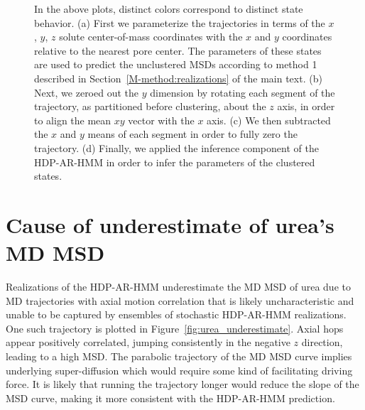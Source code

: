 \documentclass{article}
\begin{document}
\begin{figure}
\begin{subfigure}{0.6\textwidth}
		\caption{}\label{fig:zeroed_clustered_hmm}
	\end{subfigure}  
	\caption{In the above plots, distinct colors correspond to distinct state behavior. 
	(a) First we parameterize the trajectories in terms of the $x$, $y$, $z$ solute 
	center-of-mass coordinates with the $x$ and $y$ coordinates relative to the nearest 
	pore center. The parameters of these states are used to predict the unclustered MSDs
	according to method 1 described in Section~\ref{M-method:realizations} of the main
	text. (b) Next, we zeroed out the $y$ dimension by rotating each segment of the 
	trajectory, as partitioned before clustering, about the $z$ axis, in order to align the 
  	mean $xy$ vector with the $x$ axis. (c) We then subtracted the $x$ and $y$ means of
  	each segment in order to fully zero the trajectory. (d) Finally, we applied the 
  	inference component of the HDP-AR-HMM in order to infer the parameters of the 
  	clustered states.
	}\label{fig:hmm_demo}
  \end{figure}
  
  \newpage

  \section{Cause of underestimate of urea's MD MSD}\label{section:urea_underestimate}
  
  Realizations of the HDP-AR-HMM underestimate the MD MSD of urea due to MD
  trajectories with axial motion correlation that is likely uncharacteristic and
  unable to be captured by ensembles of stochastic HDP-AR-HMM realizations. One
  such trajectory is plotted in Figure~\ref{fig:urea_underestimate}. Axial hops 
  appear positively correlated, jumping consistently in the negative $z$ direction, 
  leading to a high MSD. The parabolic trajectory of the MD MSD curve implies
  underlying super-diffusion which would require some kind of facilitating
  driving force. It is likely that running the trajectory longer would reduce
  the slope of the MSD curve, making it more consistent with the HDP-AR-HMM 
  prediction.
  
\end{document}
